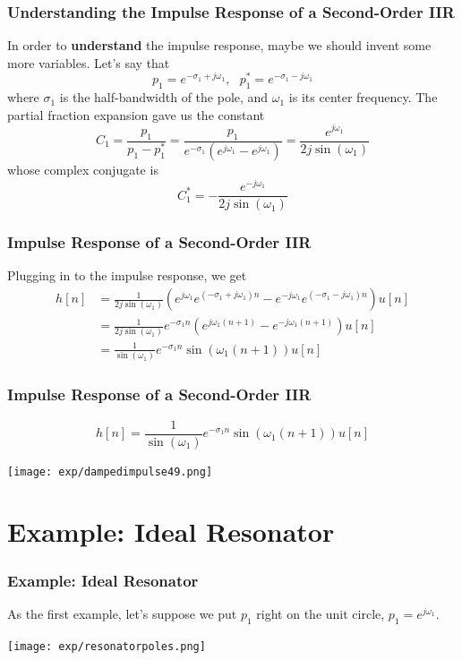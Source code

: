 \documentclass{beamer}
\begin{document}
\begin{frame}
  \frametitle{Understanding the Impulse Response of a Second-Order IIR}

  In order to {\bf understand} the impulse response, maybe we should
  invent some more variables.  Let's say that
  \[
  p_1 = e^{-\sigma_1+j\omega_1},~~~p_1^* = e^{-\sigma_1-j\omega_1}
  \]
  where $\sigma_1$ is the half-bandwidth of the pole, and $\omega_1$
  is its center frequency.  The partial fraction expansion gave us the constant
  \begin{displaymath}
    C_1 = \frac{p_1}{p_1-p_1^*}= \frac{p_1}{e^{-\sigma_1}\left(e^{j\omega_1}-e^{j\omega_1}\right)}
    = \frac{e^{j\omega_1}}{2j\sin(\omega_1)}
  \end{displaymath}
  whose complex conjugate is
  \[
  C_1^* = -\frac{e^{-j\omega_1}}{2j\sin(\omega_1)}
  \]
\end{frame}

\begin{frame}
  \frametitle{Impulse Response of a Second-Order IIR}

  Plugging in to the impulse response, we get
  \begin{align*}
    h[n] &= \frac{1}{2j\sin(\omega_1)}
    \left(e^{j\omega_1}e^{(-\sigma_1+j\omega_1)n}-e^{-j\omega_1}e^{(-\sigma_1-j\omega_1)n}\right)u[n]\\
    &= \frac{1}{2j\sin(\omega_1)}e^{-\sigma_1n}\left(e^{j\omega_1(n+1)}-e^{-j\omega_1(n+1)}\right)u[n]\\
    &= \frac{1}{\sin(\omega_1)} e^{-\sigma_1n}\sin(\omega_1(n+1)) u[n]
  \end{align*}
\end{frame}

\begin{frame}
  \frametitle{Impulse Response of a Second-Order IIR}

  \[
  h[n] = \frac{1}{\sin(\omega_1)} e^{-\sigma_1n}\sin(\omega_1(n+1)) u[n]
  \]
  \centerline{\texttt{[image: exp/dampedimpulse49.png]}}
\end{frame}


\section[Resonator]{Example: Ideal Resonator}
\setcounter{subsection}{1}

\begin{frame}
  \frametitle{Example: Ideal Resonator}

  As the first example, let's suppose we put $p_1$ right on the unit
  circle, $p_1=e^{j\omega_1}$.

  \centerline{\texttt{[image: exp/resonatorpoles.png]}}
\end{frame}
\end{document}
